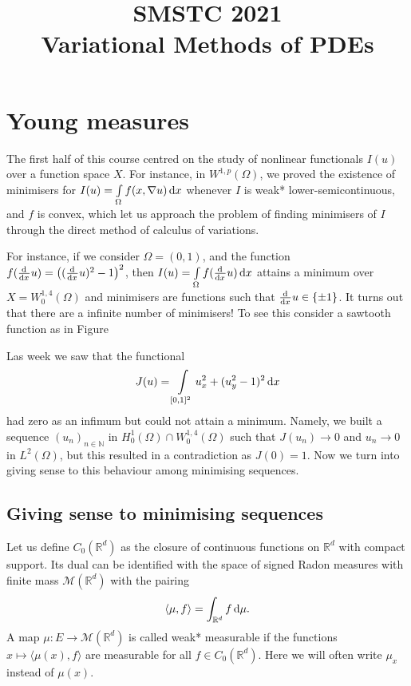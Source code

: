 \documentclass[a4paper,doc,11pt]{article}
\title{\bf
    \Large
    SMSTC 2021 
    \\
    Variational Methods of PDEs
}
\author{}%
\date{}
\newcommand{\R}{\mathbb{R}}
\newcommand{\N}{\mathbb{N}}
\begin{document}
\maketitle






\setcounter{section}{5}
\section{Young measures}


The first half of this course centred on the study of nonlinear functionals \(I(u)\) over a function space \(X\). For instance, in \(W^{1,p}(\Omega)\), we proved the existence of minimisers for \(I(u) = \int\limits_\Omega f(x,\nabla u)  \dif x\) whenever \(I\) is weak* lower-semicontinuous, and \(f\) is convex, which let us approach the problem of finding minimisers of \(I\) through the direct method of calculus of variations.

For instance, if we consider \( \Omega = (0,1)\), and the function \(f (\od{ }{x} u) = \big( (\od{ }{x} u)^2 -1 \big)^2\), then \(I(u) = \int\limits_\Omega f (\od{ }{x} u) \dif x\) attains a minimum over \(X = W^{1,4}_0(\Omega)\) and minimisers are functions such that \(\od{ }{x} u \in \{\pm 1\}\). It turns out that there are a infinite number of minimisers! To see this consider a sawtooth function as in Figure






Las week we saw that the functional 
\[
    J(u) = \int\limits_{[0,1]^2} u_x^2 + (u_y^2-1)^2 \dif x
\]
had zero as an infimum but could not attain a minimum. Namely, we built a sequence \((u_n)_{n\in \N}\) in \(H_0^1 (\Omega) \cap W_0^{1,4} (\Omega)\) such that \( J(u_n) \to 0\) and \(u_n \to 0\) in \(L^2(\Omega)\), but this resulted in a contradiction as \(J(0) = 1\). Now we turn into giving sense to this behaviour among minimising sequences.

\subsection{Giving sense to minimising sequences}

Let us define \(C_0(\R^d)\) as the closure of continuous functions on \(\R^d\) with compact support. Its dual can be identified with the space of signed Radon measures with finite mass \(\mathcal{M}(\R^d)\) with the pairing
\[
    \langle \mu,f \rangle = \int_{\R^d} f \dif \mu.
\]
A map \(\mu : E \to \mathcal{M}(\R^d)\) is called weak* measurable if the functions \(x \mapsto \langle \mu(x), f\rangle\) are measurable for all \(f\in C_0 (\R^d)\). Here we will often write \(\mu_x\) instead of \(\mu(x)\).
\end{document}
